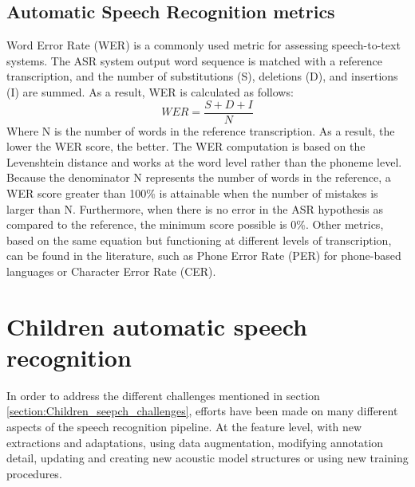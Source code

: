 \subsection{Automatic Speech Recognition metrics}%
Word Error Rate (WER) is a commonly used metric for assessing speech-to-text systems. The ASR system output word sequence is matched with a reference transcription, and the number of substitutions (S), deletions (D), and insertions (I) are summed. As a result, WER is calculated as follows:
\begin{equation}
    WER = \frac{S  + D +I}{N}
\end{equation}
Where N is the number of words in the reference transcription. As a result, the lower the WER score, the better. The WER computation is based on the Levenshtein distance and works at the word level rather than the phoneme level. Because the denominator N represents the number of words in the reference, a WER score greater than 100\% is attainable when the number of mistakes is larger than N. Furthermore, when there is no error in the ASR hypothesis as compared to the reference, the minimum score possible is 0\%.
Other metrics, based on the same equation but functioning at different levels of transcription, can be found in the literature, such as Phone Error Rate (PER) for phone-based languages or Character Error Rate (CER).

\newpage
\section{Children automatic speech recognition} %
In order to address the different challenges mentioned in section \ref{section:Children_seepch_challenges}, efforts have been made on many different aspects of the speech recognition pipeline. At the feature level, with new extractions and adaptations, using data augmentation, modifying annotation detail, updating and creating new acoustic model structures or using new training procedures.

